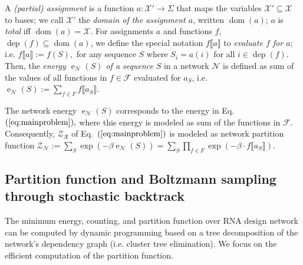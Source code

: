 \documentclass{bioinfo}
\newcommand{\network}{\mathcal{N}}
\newcommand{\dom}{\operatorname{dom}} %
\newcommand{\val}{a} %
\newcommand{\dep}{\operatorname{dep}}
\newcommand{\energy}[1]{\operatorname{e}_{#1}}
\newcommand{\numberof}{\operatorname{\#}}
\newcommand{\partfun}[1]{\mathcal{Z}_{#1}}
\newcommand{\F}{\mathcal{F}}
\newcommand{\R}{\mathcal{R}}
\newcommand{\X}{\mathcal{X}}
\newcommand{\Def}[1]{{\it #1}}
\newcommand{\evalfor}[2]{#1\llbracket{}#2\rrbracket{}}
\begin{document}
A \Def{(partial) assignment} is a function $\val: \X' \to \Sigma$
that maps the variables $\X'\subseteq \X$ to bases; we call $\X'$ the \Def{domain of the assignment
  $\val$}, written $\dom(\val)$; $\val$ is \Def{total} iff $\dom(\val)=\X.$
%
For assignments $\val$ and functions $f$, $\dep(f)\subseteq\dom(\val)$,
we define the special notation $\evalfor{f}{\val}$ to \Def{evaluate
  $f$ for $\val$}; i.e.{} $\evalfor{f}{\val} := f(S),$ for any
sequence $S$ where $S_i=\val(i)$ for all $i\in\dep(f).$ Then, the
\Def{energy $\energy{\network}(S)$ of a sequence} $S$ in a network
$\network$ is defined as sum of the values of all functions in
$f\in\F$ evaluated for $\val_S$, i.e.
$\energy{\network}(S) := \sum_{f\in F} \evalfor{f}{\val_S}.$

The network energy $\energy{\network}(S)$ corresponds to the energy in
Eq.~$(\ref{eq:mainproblem}),$ where this energy is modeled as sum of
the functions in $\F$. Consequently, $\partfun{\R}$ of
Eq.~$(\ref{eq:mainproblem})$ is modeled as network partition function
$\partfun{\network} := \sum_{S}\exp(-\beta\energy{\network}(S)) = \sum_{S}\prod_{f\in F} \exp( -\beta\cdot
\evalfor{f}{\val_S} ).$



\subsection{Partition function and Boltzmann sampling through stochastic backtrack}\label{sec:PF}
The minimum energy, counting, and partition function
over RNA design network can be computed by dynamic programming based
on a tree decomposition of the network's dependency graph
(i.e. cluster tree elimination).
We focus on the efficient computation of the partition
function. %
\end{document}
